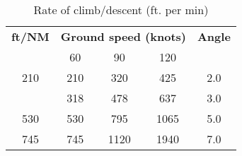 {}

\begin{table}[H]
    \caption{Rate of climb/descent (ft. per min)}

    \begin{center}
        \begin{tabular}{ccccc}
            \toprule
            \textbf{ft/NM} & \multicolumn{3}{c}{\textbf{Ground speed (knots)}} & \textbf{Angle}
            \\\cmidrule(lr){2-4}
                           & 60                                                & 90             & 120  &                  \\
            \midrule
            210            & 210                                               & 320            & 425  & 2.0\textdegree{} \\\addlinespace
            318            & 318                                               & 478            & 637  & 3.0\textdegree{} \\
            530            & 530                                               & 795            & 1065 & 5.0\textdegree{} \\
            745            & 745                                               & 1120           & 1940 & 7.0\textdegree{} \\
            \bottomrule
        \end{tabular}
    \end{center}
\end{table}
